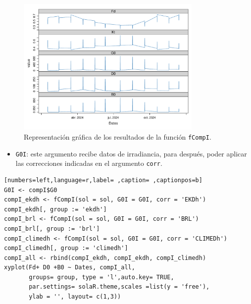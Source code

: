 \begin{itemize}
\begin{figure}[!htb]
\centering
\includegraphics[width=0.8\textwidth]{figuras/codigo-fcompicompd.pdf}
\caption{Representación gráfica de los resultados de la función \texttt{fCompI}.}
\end{figure}
\begin{itemize}
\item \texttt{G0I}: este argumento recibe datos de irradiancia, para después, poder aplicar las correcciones indicadas en el argumento \texttt{corr}.
\end{itemize}
\begin{lstlisting}[numbers=left,language=r,label= ,caption= ,captionpos=b]
G0I <- compI$G0
compI_ekdh <- fCompI(sol = sol, G0I = G0I, corr = 'EKDh')
compI_ekdh[, group := 'ekdh']
compI_brl <- fCompI(sol = sol, G0I = G0I, corr = 'BRL')
compI_brl[, group := 'brl']
compI_climedh <- fCompI(sol = sol, G0I = G0I, corr = 'CLIMEDh')
compI_climedh[, group := 'climedh']
compI_all <- rbind(compI_ekdh, compI_ekdh, compI_climedh)
xyplot(Fd+ D0 +B0 ~ Dates, compI_all,
       groups= group, type = 'l',auto.key= TRUE,
       par.settings= solaR.theme,scales =list(y = 'free'),
       ylab = '', layout= c(1,3))
\end{lstlisting}


\end{itemize}

